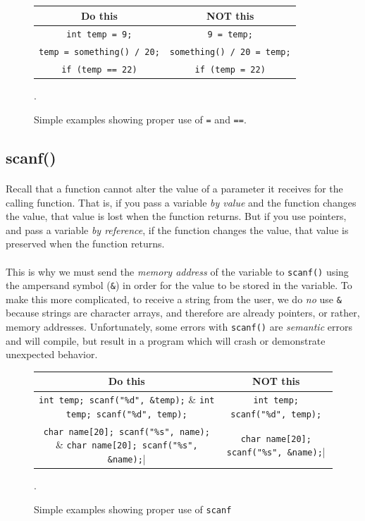 \documentclass[letter,11pt]{article}
\begin{document}
\begin{figure}[h!]
    \centering
    \begin{tabular}{c|c}
        Do this & NOT this \\ \hline
        \verb|int temp = 9;| & \verb|9 = temp;| \\
        \verb|temp = something() / 20;| & \verb|something() / 20 = temp;| \\
        \verb|if (temp == 22)| & \verb|if (temp = 22)|
    \end{tabular}
    \caption{Simple examples showing proper use of \texttt{=} and \texttt{==}.}.
    \label{fig:assignmentvsequality}
\end{figure}

\FloatBarrier
\subsection{scanf()}
\paragraph{}Recall that a function cannot alter the value of a parameter it receives for the calling function. That is, if you pass a variable \textit{by value} and the function changes the value, that value is lost when the function returns. But if you use pointers, and pass a variable \textit{by reference}, if the function changes the value, that value is preserved when the function returns.

\paragraph{}This is why we must send the \textit{memory address} of the variable to \texttt{scanf()} using the ampersand symbol (\texttt{\&}) in order for the value to be stored in the variable. To make this more complicated, to receive a string from the user, we do \textit{no} use \texttt{\&} because strings are character arrays, and therefore are already pointers, or rather, memory addresses. Unfortunately, some errors with \texttt{scanf()} are \textit{semantic} errors and will compile, but result in a program which will crash or demonstrate unexpected behavior.

\begin{figure}[h!]
    \centering
    \begin{tabular}{c|c}
        Do this & NOT this \\ \hline
        \verb|int temp; scanf("%d", &temp);| & \verb|int temp; scanf("%d", temp);| \\
        \verb|char name[20]; scanf("%s", name);| & \verb|char name[20]; scanf("%s", &name);|
    \end{tabular}
    \caption{Simple examples showing proper use of \texttt{scanf}}.
    \label{fig:scanfdodont}
\end{figure}
\end{document}
